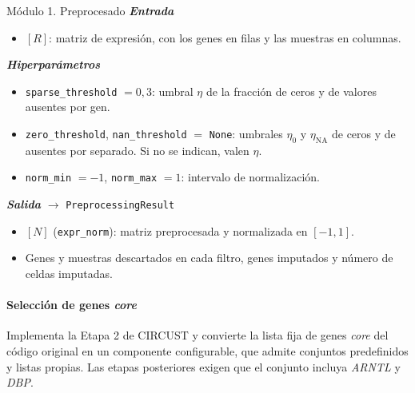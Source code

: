 \documentclass[12pt, a4paper]{report}
\newcommand{\dato}[2]{{\boldmath\textcolor{#1}{#2}}}
\begin{document}
\begin{panel}{Módulo 1. Preprocesado}
\textit{\textbf{Entrada}}
\begin{itemize}[nosep,leftmargin=1.5em]
\item \([R]\): matriz de expresión, con los genes en filas y las muestras en columnas.
\end{itemize}

\textit{\textbf{Hiperparámetros}}
\begin{itemize}[nosep,leftmargin=1.5em]
\item \texttt{sparse\_threshold} \(=0{,}3\): umbral \(\eta\) de la fracción de ceros y de valores ausentes por gen.
\item \texttt{zero\_threshold}, \texttt{nan\_threshold} \(=\) \texttt{None}: umbrales \(\eta_0\) y \(\eta_{\mathrm{NA}}\) de ceros y de ausentes por separado. Si no se indican, valen \(\eta\).
\item \texttt{norm\_min} \(=-1\), \texttt{norm\_max} \(=1\): intervalo de normalización.
\end{itemize}

\textit{\textbf{Salida}} \(\rightarrow\) \texttt{PreprocessingResult}
\begin{itemize}[nosep,leftmargin=1.5em]
\item \dato{dN}{\([N]\) (\texttt{expr\_norm})}: matriz preprocesada y normalizada en \([-1,1]\).
\item Genes y muestras descartados en cada filtro, genes imputados y número de celdas imputadas.
\end{itemize}
\end{panel}

\paragraph{Selección de genes \textit{core}}
Implementa la Etapa 2 de CIRCUST y convierte la lista fija de genes \textit{core} del código original en un componente configurable, que admite conjuntos predefinidos y listas propias. Las etapas posteriores exigen que el conjunto incluya \textit{ARNTL} y \textit{DBP}.
\end{document}
